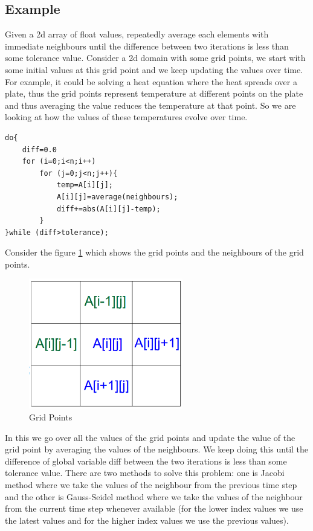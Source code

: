 \documentclass[12pt]{article}
\begin{document}
\subsection{Example}
Given a 2d array of float values, repeatedly average each elements with immediate neighbours until the difference between two
iterations is less than some tolerance value. Consider a 2d domain with some grid points, we start with some initial values at this grid point and we keep updating the values over time.
For example, it could be solving a heat equation where the heat spreads over a plate, thus the grid points represent temperature at different points on the plate and thus averaging the value reduces the temperature at that point.
So we are looking at how the values of these temperatures evolve over time.

\begin{lstlisting}[caption={Parallel Program for Averaging},captionpos=b]
do{
    diff=0.0
    for (i=0;i<n;i++)
        for (j=0;j<n;j++){
            temp=A[i][j];
            A[i][j]=average(neighbours);
            diff+=abs(A[i][j]-temp);
        }
}while (diff>tolerance);    
\end{lstlisting}
Consider the figure \ref{fig:grid} which shows the grid points and the neighbours of the grid points.
\begin{figure}[H]
    \centering
    \includegraphics[width=0.6\textwidth]{images/grid.png}
    \caption{Grid Points}
    \label{fig:grid}
\end{figure}
In this we go over all the values of the grid points and update the value of the grid point by averaging the values of the neighbours. We keep doing this until the difference of global variable diff between the two iterations is less than some tolerance value.
There are two methods to solve this problem: one is Jacobi method where we take the values of the neighbour from the previous time step and the other is Gauss-Seidel method where we take the values of the neighbour from the current time step whenever available (for the lower index values we use the latest values and for the higher index values we use the previous values).
\end{document}
